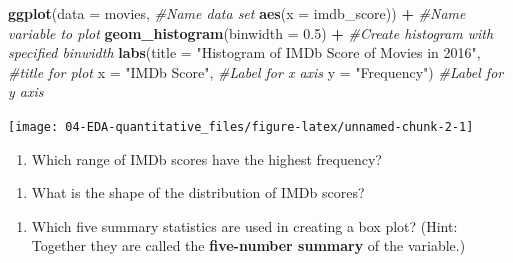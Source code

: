 \documentclass[
]{report}
\newenvironment{Shaded}{\begin{snugshade}}{\end{snugshade}}
\newcommand{\CommentTok}[1]{\textcolor[rgb]{0.56,0.35,0.01}{\textit{#1}}}
\newcommand{\DataTypeTok}[1]{\textcolor[rgb]{0.13,0.29,0.53}{#1}}
\newcommand{\FloatTok}[1]{\textcolor[rgb]{0.00,0.00,0.81}{#1}}
\newcommand{\KeywordTok}[1]{\textcolor[rgb]{0.13,0.29,0.53}{\textbf{#1}}}
\newcommand{\NormalTok}[1]{#1}
\newcommand{\OperatorTok}[1]{\textcolor[rgb]{0.81,0.36,0.00}{\textbf{#1}}}
\newcommand{\StringTok}[1]{\textcolor[rgb]{0.31,0.60,0.02}{#1}}
\providecommand{\tightlist}{%
  \setlength{\itemsep}{0pt}\setlength{\parskip}{0pt}}
\begin{document}
\begin{Shaded}
\begin{Highlighting}[]
\KeywordTok{ggplot}\NormalTok{(}\DataTypeTok{data =}\NormalTok{ movies,   }\CommentTok{\#Name data set}
       \KeywordTok{aes}\NormalTok{(}\DataTypeTok{x =}\NormalTok{ imdb\_score)) }\OperatorTok{+}\StringTok{   }\CommentTok{\#Name variable to plot}
\StringTok{  }\KeywordTok{geom\_histogram}\NormalTok{(}\DataTypeTok{binwidth =} \FloatTok{0.5}\NormalTok{) }\OperatorTok{+}\StringTok{  }\CommentTok{\#Create histogram with specified binwidth}
\StringTok{  }\KeywordTok{labs}\NormalTok{(}\DataTypeTok{title =} \StringTok{"Histogram of IMDb Score of Movies in 2016"}\NormalTok{, }\CommentTok{\#title for plot}
       \DataTypeTok{x =} \StringTok{"IMDb Score"}\NormalTok{, }\CommentTok{\#Label for x axis}
       \DataTypeTok{y =} \StringTok{"Frequency"}\NormalTok{) }\CommentTok{\#Label for y axis}
\end{Highlighting}
\end{Shaded}

\begin{center}\texttt{[image: 04-EDA-quantitative\_files/figure-latex/unnamed-chunk-2-1]} \end{center}

\begin{enumerate}
\def\labelenumi{\arabic{enumi}.}
\setcounter{enumi}{7}
\tightlist
\item
  Which range of IMDb scores have the highest frequency?
\end{enumerate}

\vspace{0.4in}

\begin{enumerate}
\def\labelenumi{\arabic{enumi}.}
\setcounter{enumi}{8}
\tightlist
\item
  What is the shape of the distribution of IMDb scores?
\end{enumerate}

\vspace{0.4in}

\begin{enumerate}
\def\labelenumi{\arabic{enumi}.}
\setcounter{enumi}{9}
\tightlist
\item
  Which five summary statistics are used in creating a box plot? (Hint: Together they are called the \textbf{five-number summary} of the variable.)
\end{enumerate}

\vspace{0.4in}
\end{document}
